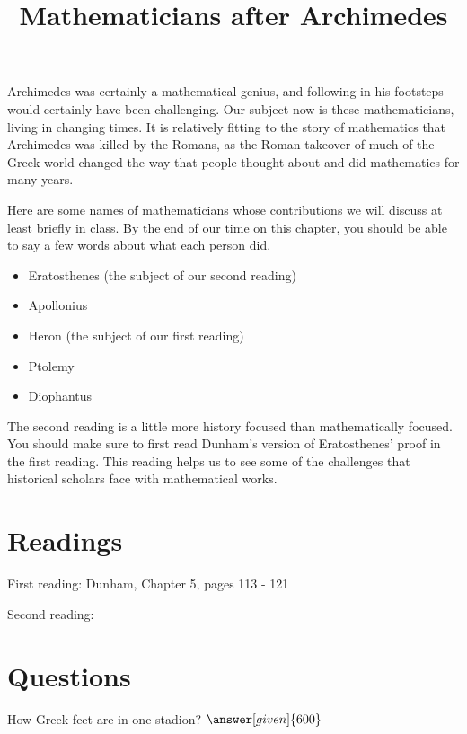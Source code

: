 \documentclass[nooutcomes]{ximera}
\title{Mathematicians after Archimedes}
\begin{document}
\begin{abstract}
    
\end{abstract}
\maketitle

Archimedes was certainly a mathematical genius, and following in his footsteps would certainly have been challenging.  Our subject now is these mathematicians, living in changing times.  It is relatively fitting to the story of mathematics that Archimedes was killed by the Romans, as the Roman takeover of much of the Greek world changed the way that people thought about and did mathematics for many years.

Here are some names of mathematicians whose contributions we will discuss at least briefly in class.  By the end of our time on this chapter, you should be able to say a few words about what each person did.
\begin{itemize}
\item Eratosthenes (the subject of our second reading)
\item Apollonius
\item Heron (the subject of our first reading)
\item Ptolemy
\item Diophantus
\end{itemize}

The second reading is a little more history focused than mathematically focused.  You should make sure to first read Dunham's version of Eratosthenes' proof in the first reading.  This reading helps us to see some of the challenges that historical scholars face with mathematical works.


\section{Readings}
First reading: Dunham, Chapter 5, pages 113 - 121 

Second reading: 

\section{Questions}

\begin{question}
How Greek feet are in one stadion? $\answer[given]{600}$
\end{question}
\end{document}
